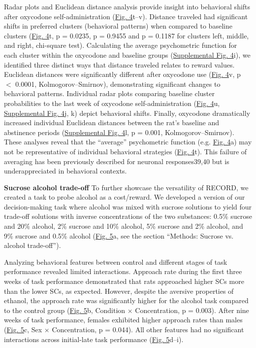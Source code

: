 \documentclass{article}
\begin{document}
Radar plots and Euclidean distance analysis provide insight into behavioral shifts after oxycodone self-administration (\hyperref[fig:Record_main_4]{Fig. 4}t–v). Distance traveled had significant shifts in preferred clusters (behavioral patterns) when compared to baseline clusters (\hyperref[fig:Record_main_4]{Fig. 4}t, p = 0.0235, p = 0.9455 and p = 0.1187 for clusters left, middle, and right, chi-square test). Calculating the average psychometric function for each cluster within the oxycodone and baseline groups (\hyperref[fig:Record_SI_4]{Supplemental Fig. 4}i), we identified three distinct ways that distance traveled relates to reward values. Euclidean distances were significantly different after oxycodone use (\hyperref[fig:Record_main_4]{Fig. 4}v, p $<$ 0.0001, Kolmogorov–Smirnov), demonstrating significant changes to behavioral patterns. Individual radar plots comparing baseline cluster probabilities to the last week of oxycodone self-administration (\hyperref[fig:Record_main_4]{Fig. 4}u, \hyperref[fig:Record_SI_4]{Supplemental Fig. 4}j, k) depict behavioral shifts. Finally, oxycodone dramatically increased individual Euclidean distances between the rat’s baseline and abstinence periods (\hyperref[fig:Record_SI_4]{Supplemental Fig. 4}l, p = 0.001, Kolmogorov–Smirnov). These analyses reveal that the “average” psychometric function (e.g. \hyperref[fig:Record_main_4]{Fig. 4}a) may not be representative of individual behavioral strategies (\hyperref[fig:Record_main_4]{Fig. 4}t). This failure of averaging has been previously described for neuronal responses39,40 but is underappreciated in behavioral contexts.

\vspace{1em}

\noindent\textbf{Sucrose alcohol trade-off}
To further showcase the versatility of RECORD, we created a task to probe alcohol as a cost/reward. We developed a version of our decision-making task where alcohol was mixed with sucrose solutions to yield four trade-off solutions with inverse concentrations of the two substances: 0.5\% sucrose and 20\% alcohol, 2\% sucrose and 10\% alcohol, 5\% sucrose and 2\% alcohol, and 9\% sucrose and 0.5\% alcohol (\hyperref[fig:Record_main_5]{Fig. 5}a, see the section “Methods: Sucrose vs. alcohol trade-off”).

\vspace{1em}

Analyzing behavioral features between control and different stages of task performance revealed limited interactions. Approach rate during the first three weeks of task performance demonstrated that rats approached higher SCs more than the lower SCs, as expected. However, despite the aversive properties of ethanol\cite{pautassi2011ethanol, anderson2010ethanol}, the approach rate was significantly higher for the alcohol task compared to the control group (\hyperref[fig:Record_main_5]{Fig. 5}b, Condition × Concentration, p = 0.003). After nine weeks of task performance, females exhibited higher approach rates than males (\hyperref[fig:Record_main_5]{Fig. 5}c, Sex × Concentration, p = 0.044). All other features had no significant interactions across initial-late task performance (\hyperref[fig:Record_main_5]{Fig. 5}d–i).
\end{document}
